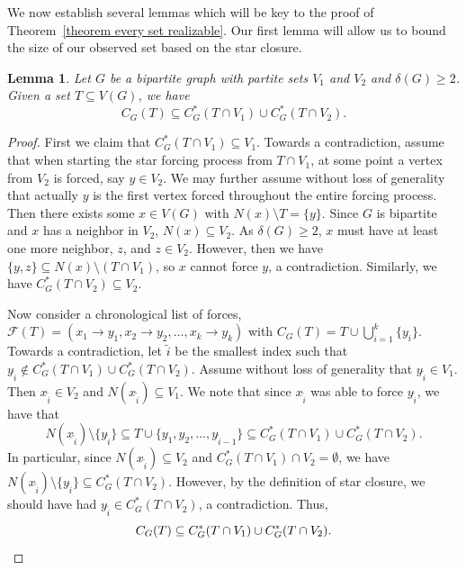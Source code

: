 \documentclass{article}
\newtheorem{lemma}[theorem]{Lemma}
\begin{document}
        We now establish several lemmas which will be key to the proof of Theorem~\ref{theorem every set realizable}.
        Our first lemma will allow us to bound the size of our observed set based on the star closure.
        \begin{lemma}\label{lemma forcing the even and odd parts of a bipartite graph}
            Let $G$ be a bipartite graph with partite sets $V_1$ and $V_2$ and $\delta(G)\geq 2$. Given a set $T\subseteq V(G)$, we have
            \[ C_G(T)\subseteq C_G^*(T\cap V_1)\cup C_{G}^*(T\cap V_2). \]
        \end{lemma}
        \begin{proof}
            First we claim that $C_G^*(T\cap V_1)\subseteq V_1$.
            Towards a contradiction, assume that when starting the star forcing process from $T\cap V_1$, at some point a vertex from $V_2$ is forced, say $y\in V_2$. We may further assume without loss of generality that actually $y$ is the first vertex forced throughout the entire forcing process. Then there exists some $x\in V(G)$ with  $ N(x)\setminus T=\{y\}$.
            Since $G$ is bipartite and $x$ has a neighbor in $V_2$, $N(x)\subseteq V_2$.
            As $\delta(G) \geq 2$, $x$ must have at least one more neighbor, $z$, and $z\in V_2$.
            However, then we have $\{y,z\}\subseteq N(x) \setminus (T\cap V_1)$, so $x$ cannot force $y$, a contradiction.
            Similarly, we have $C_G^*(T\cap V_2)\subseteq V_2$.

            Now consider a chronological list of forces, $\mathcal{F}(T) =(x_1\to y_1, x_2\to y_2,\dots,x_k\to y_k)$ with $C_G(T)=T\cup \bigcup_{i=1}^k \{y_i\}.$
            Towards a contradiction, let $\tilde{i}$ be the smallest index such that $y_{\tilde{i}}\not\in C_G^*(T\cap V_1)\cup C_{G}^*(T\cap V_2)$.
            Assume without loss of generality that $y_{\tilde{i}}\in V_1$.
            Then $x_{\tilde{i}}\in V_2$ and $N(x_{\tilde{i}})\subseteq V_1$.
            We note that since $x_{\tilde{i}}$ was able to force $y_{\tilde{i}}$, we have that 
                \[ N(x_{\tilde{i}})\setminus \{y_{\tilde{i}}\}\subseteq T\cup \{y_1,y_2,\dots,y_{\tilde{i}-1}\}\subseteq C_G^*(T\cap V_1)\cup C_{G}^*(T\cap V_2). \]
            In particular, since $N(x_{\tilde{i}})\subseteq V_2$ and $C_{G}^*(T\cap V_1)\cap V_2=\emptyset$, we have $N(x_{\tilde{i}})\setminus \{y_{\tilde{i}}\}\subseteq C_{G}^*(T\cap V_2)$.
            However, by the definition of star closure, we should have had $y_{\tilde{i}}\in C_{G}^*(T\cap V_2)$, a contradiction.
            Thus,
                \[ C_G(T)\subseteq C_G^*(T\cap V_1)\cup C_{G}^*(T\cap V_2). \qedhere \]
        \end{proof}
\end{document}
